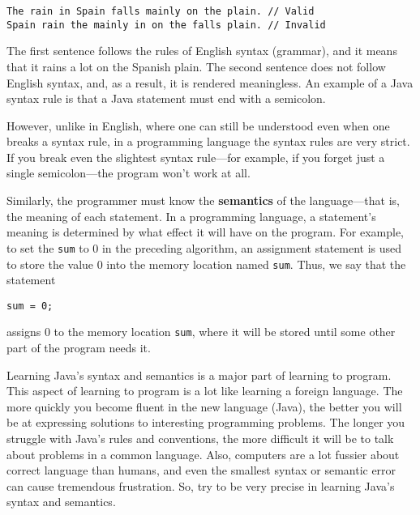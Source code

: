 \begin{jjjlisting}
\begin{lstlisting}
The rain in Spain falls mainly on the plain. // Valid
Spain rain the mainly in on the falls plain. // Invalid
\end{lstlisting}
\end{jjjlisting}


\noindent The first sentence follows the rules of English syntax (grammar),
and it means that it rains a lot on the Spanish plain.  The second
sentence does not follow English syntax, and, as a result, it is
rendered meaningless. An example of a Java syntax rule is that a Java
statement must end with a semicolon.

However, unlike in English, where one can still be understood even
when one breaks a syntax rule, in a programming language the syntax
rules are very strict. If you break even the slightest syntax
rule---for example, if you forget just a single semicolon---the
program won't work at all. 


Similarly, the programmer must know the
{\bf semantics} of the language---that is, the meaning of each
statement.  In a programming language, a statement's meaning is
determined by what effect it will have on the program.  For example,
to set the {\tt sum} to 0 in the preceding algorithm, an assignment
statement is used to store the value 0 into the memory location named
{\tt sum}.  Thus, we say that the statement


\begin{jjjlisting}
\begin{lstlisting}
sum = 0;
\end{lstlisting}
\end{jjjlisting}

\noindent assigns 0 to the memory location {\tt sum}, where 
it will be stored until some other part of the program needs it.

Learning Java's syntax and semantics is a major part of learning to
program.  This aspect of learning to program is a lot like learning a
foreign language.  The more quickly you become fluent in the new
language (Java), the better you will be at expressing solutions to
interesting programming problems.  The longer you struggle with Java's
rules and conventions, the more difficult it will be to talk about
problems in a common language.  Also, computers are a lot fussier
about correct language than humans, and even the smallest syntax or
semantic error can cause tremendous frustration.  So, try to be very
precise in learning Java's syntax and semantics.

